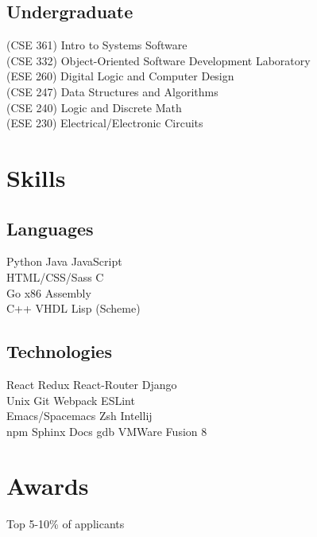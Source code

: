 \documentclass[]{deedy-resume-openfont}
\begin{document}
\begin{minipage}[t]{0.33\textwidth}
\subsection{Undergraduate}
(CSE 361) Intro to Systems Software\\
(CSE 332) Object-Oriented Software Development Laboratory\\
(ESE 260) Digital Logic and Computer Design\\
(CSE 247) Data Structures and Algorithms\\
(CSE 240) Logic and Discrete Math\\
(ESE 230) Electrical/Electronic Circuits\\
\sectionsep


\section{Skills}
\subsection{Languages}
Python \textbullet{} Java \textbullet{} JavaScript \\
HTML/CSS/Sass \textbullet{} C \\
Go \textbullet{} x86 Assembly \\
C++ \textbullet{} VHDL \textbullet{} Lisp (Scheme) \\
\sectionsep

\subsection{Technologies}
React \textbullet{} Redux \textbullet{} React-Router \textbullet{} Django \\
Unix \textbullet{} Git \textbullet{} Webpack \textbullet{} ESLint \\
Emacs/Spacemacs \textbullet{} Zsh \textbullet{} Intellij \\
npm \textbullet{} Sphinx Docs \textbullet{} gdb \textbullet{} VMWare Fusion 8 \\
\sectionsep


\section{Awards}
\vspace{\topsep} %
\begin{tightemize}
\item Top 5-10\% of applicants
\end{tightemize}


\end{minipage}
\end{document}
